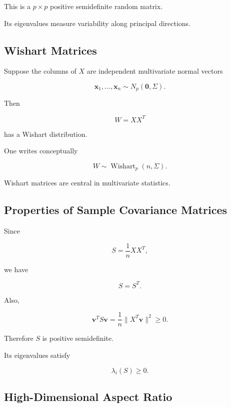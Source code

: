 This is a \(p\times p\) positive semidefinite random matrix.

Its eigenvalues measure variability along principal directions.

\subsection{Wishart Matrices}
\label{subsec:wishart-matrices}

Suppose the columns of \(X\) are independent multivariate normal vectors

\[
\mathbf{x}_1,\ldots,\mathbf{x}_n
\sim
N_p(\mathbf{0},\Sigma).
\]

Then

\[
\boxed{
W
=
XX^T
}
\]

has a Wishart distribution.

One writes conceptually

\[
\boxed{
W
\sim
\operatorname{Wishart}_p(n,\Sigma).
}
\]

Wishart matrices are central in multivariate statistics.

\subsection{Properties of Sample Covariance Matrices}
\label{subsec:sample-covariance-properties}

Since

\[
S
=
\frac1nXX^T,
\]

we have

\[
\boxed{
S=S^T.
}
\]

Also,

\[
\boxed{
\mathbf{v}^TS\mathbf{v}
=
\frac1n
\|X^T\mathbf{v}\|^2
\geq0.
}
\]

Therefore \(S\) is positive semidefinite.

Its eigenvalues satisfy

\[
\boxed{
\lambda_i(S)\geq0.
}
\]

\subsection{High-Dimensional Aspect Ratio}
\label{subsec:aspect-ratio-rmt}

